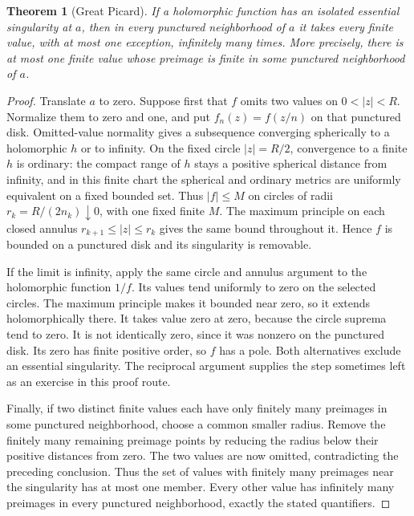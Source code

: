 \documentclass[11pt,a4paper,openany]{book}
\newtheorem{theorem}{Theorem}[chapter]
\theoremstyle{definition}
\theoremstyle{remark}\newtheorem{remark}[theorem]{Remark}
\newcommand{\family}[1]{}
\begin{document}
\begin{theorem}[Great Picard]\label{d12:23-05}\family{D12.23.05}
If a holomorphic function has an isolated essential singularity at
$a$, then in every punctured neighborhood of $a$ it takes every finite
value, with at most one exception, infinitely many times. More precisely,
there is at most one finite value whose preimage is finite in some
punctured neighborhood of $a$.
\end{theorem}
\begin{proof}
Translate $a$ to zero. Suppose first that $f$ omits two values on
$0<|z|<R$. Normalize them to zero and one, and put $f_n(z)=f(z/n)$
on that punctured disk. Omitted-value normality gives a subsequence
converging spherically to a holomorphic $h$ or to infinity. On the
fixed circle $|z|=R/2$, convergence to a finite $h$ is ordinary:
the compact range of $h$ stays a positive spherical distance from
infinity, and in this finite chart the spherical and ordinary metrics
are uniformly equivalent on a fixed bounded set. Thus $|f|\le M$
on circles of radii $r_k=R/(2n_k)\downarrow0$, with one fixed finite
$M$. The maximum principle on each closed annulus
$r_{k+1}\le|z|\le r_k$ gives the same bound throughout it. Hence
$f$ is bounded on a punctured disk and its singularity is removable.

If the limit is infinity, apply the same circle and annulus argument
to the holomorphic function $1/f$. Its values tend uniformly to zero
on the selected circles. The maximum principle makes it bounded
near zero, so it extends holomorphically there. It takes value zero
at zero, because the circle suprema tend to zero. It is not identically
zero, since it was nonzero on the punctured disk. Its zero has finite
positive order, so $f$ has a pole. Both alternatives exclude an
essential singularity. The reciprocal argument supplies the step
sometimes left as an exercise in this proof route.

Finally, if two distinct finite values each have only finitely many
preimages in some punctured neighborhood, choose a common smaller
radius. Remove the finitely many remaining preimage points by reducing
the radius below their positive distances from zero. The two values
are now omitted, contradicting the preceding conclusion. Thus the
set of values with finitely many preimages near the singularity has
at most one member. Every other value has infinitely many preimages
in every punctured neighborhood, exactly the stated quantifiers.
\end{proof}
\end{document}
